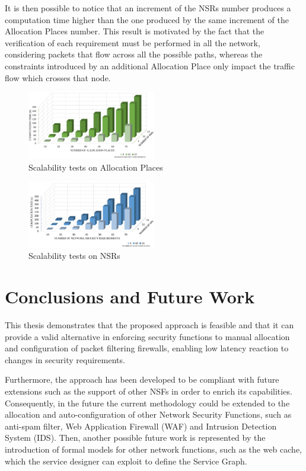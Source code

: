 \documentclass[10pt,a4paper,roman, twocolumn]{article}
\begin{document}
It is then possible to notice that an increment of the NSRs number produces a computation time higher than the one produced by the same increment of the Allocation Places number. This result is motivated by the fact that the verification of each requirement must be performed in all the network, considering packets that flow across all the possible paths, whereas the constraints introduced by an additional Allocation Place only impact the traffic flow which crosses that node.

\begin{figure} [tbh]
	\centerline{\includegraphics[width=0.5\textwidth]{images/scalability01.pdf}}
	\caption{Scalability tests on Allocation Places}
	\label{fig:perf01}
\end{figure}


\begin{figure} [tbh]
	\centerline{\includegraphics[width=0.5\textwidth]{images/scalability02.pdf}}
	\caption{Scalability tests on NSRs}
	\label{fig:perf02}
\end{figure}

\section{Conclusions and Future Work}
	 
This thesis demonstrates that the proposed approach is feasible and that it can provide a valid alternative in enforcing security functions to manual allocation and configuration of packet filtering firewalls, enabling low latency reaction to changes in security requirements. 

Furthermore, the approach has been developed to be compliant with future extensions such as the support of other NSFs in order to enrich its capabilities. Consequently, in the future the current methodology could be extended to the allocation and auto-configuration of other Network Security Functions, such as anti-spam filter, Web Application Firewall (WAF) and Intrusion Detection System (IDS). %
Then, another possible future work is represented by the introduction of formal models for other network functions, such as the web cache, which the service designer can exploit to define the Service Graph.
\end{document}
